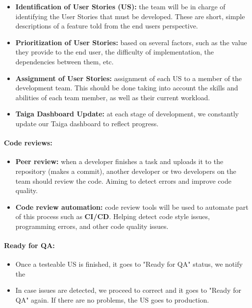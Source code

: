 \begin{itemize}
\tightlist
\item
  \textbf{Identification of User Stories (US):} the team will be in
  charge of identifying the User Stories that must be developed. These
  are short, simple descriptions of a feature told from the end
  user\textquotesingle s perspective.
\item
  \textbf{Prioritization of User Stories:} based on several factors,
  such as the value they provide to the end user, the difficulty of
  implementation, the dependencies between them, etc.
\item
  \textbf{Assignment of User Stories:} assignment of each US to a member
  of the development team. This should be done taking into account the
  skills and abilities of each team member, as well as their current
  workload.
\item
  \textbf{Taiga Dashboard Update:} at each stage of development, we
  constantly update our Taiga dashboard to reflect progress.
\end{itemize}

\hypertarget{codereviewsnbsp}{
\paragraph{Code reviews:~}\label{codereviewsnbsp}}

\begin{itemize}
\tightlist
\item
  \textbf{Peer review:} when a developer finishes a task and uploads it
  to the repository (makes a commit), another developer or two developers on the team
  should review the code. Aiming to detect errors and improve code
  quality.
\item
  \textbf{Code review automation:} code review tools will be used to
  automate part of this process such as \textbf{CI/CD}. Helping detect
  code style issues, programming errors, and other code quality issues.
\end{itemize}

\hypertarget{readyforqa}{
\paragraph{Ready for QA:}\label{readyforqa}}

\begin{itemize}
\tightlist
\item
  Once a testeable US is finished, it goes to "Ready for QA" status, we notify the
\item
  In case issues are detected, we proceed to correct and it goes to "Ready for QA" again. If there are no problems, the US goes to production.
\end{itemize}

